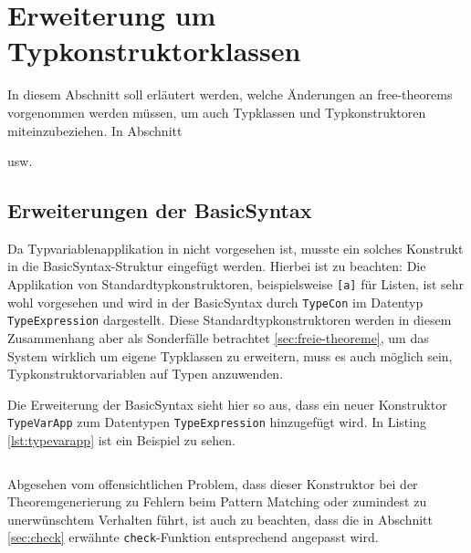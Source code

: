 \section{Erweiterung um Typkonstruktorklassen}

\label{sec:erweiterung-um-typklassen}


In diesem Abschnitt soll erläutert werden, welche Änderungen an free-theorems vorgenommen werden müssen, um auch Typklassen und Typkonstruktoren miteinzubeziehen. In
Abschnitt 

usw.


\subsection{Erweiterungen der BasicSyntax}

Da Typvariablenapplikation in \cite{freetheorems} nicht vorgesehen ist, musste ein solches Konstrukt in die BasicSyntax-Struktur eingefügt werden. Hierbei ist zu beachten: Die Applikation
von Standardtypkonstruktoren, beispielsweise \texttt{[a]} für Listen, ist sehr wohl vorgesehen und wird in der BasicSyntax durch \texttt{TypeCon} im Datentyp \texttt{TypeExpression} dargestellt.  Diese Standardtypkonstruktoren werden in diesem Zusammenhang aber als Sonderfälle betrachtet \ref{sec:freie-theoreme}, um das System wirklich um eigene Typklassen zu erweitern, muss es auch möglich sein, Typkonstruktorvariablen auf Typen anzuwenden.

Die Erweiterung der BasicSyntax sieht hier so aus, dass ein neuer Konstruktor \texttt{TypeVarApp} zum Datentypen \texttt{TypeExpression} hinzugefügt wird. In Listing \ref{lst:typevarapp} ist ein Beispiel zu sehen.

\inputminted[tabsize=2]{haskell}{typevarapp.hs}

Abgesehen vom offensichtlichen Problem, dass dieser Konstruktor bei der Theoremgenerierung zu Fehlern beim Pattern Matching oder zumindest zu unerwünschtem Verhalten führt,
ist auch zu beachten, dass die in Abschnitt \ref{sec:check} erwähnte \texttt{check}-Funktion entsprechend angepasst wird.



